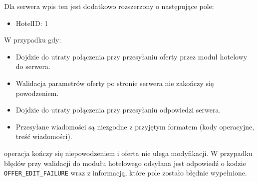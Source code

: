 \documentclass{article}
\begin{document}
Dla serwera wpis ten jest dodatkowo rozszerzony o następujące pole:
\begin{itemize}
    \item HotelID: 1
\end{itemize}
W przypadku gdy:
\begin{itemize}
    \item Dojdzie do utraty połączenia przy przesyłaniu oferty przez moduł hotelowy do serwera. 
    \item Walidacja parametrów oferty po stronie serwera nie zakończy się powodzeniem.
    \item Dojdzie do utraty połączenia przy przesyłaniu odpowiedzi serwera.
    \item Przesyłane wiadomości są niezgodne z przyjętym formatem (kody operacyjne, treść wiadomości).
\end{itemize}
operacja kończy się niepowodzeniem i oferta nie ulega modyfikacji. W przypadku błędów przy walidacji do modułu hotelowego odsyłana jest odpowiedź o kodzie \texttt{OFFER\_EDIT\_FAILURE} wraz z informacją, które pole zostało błędnie wypełnione.
\end{document}
